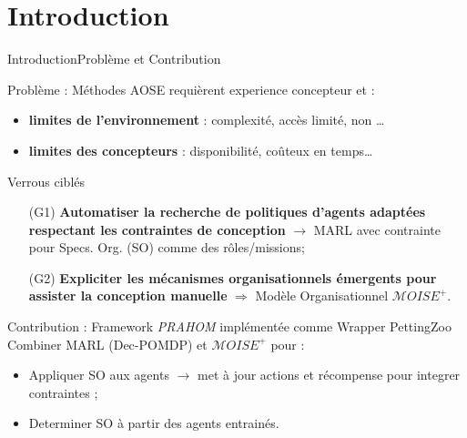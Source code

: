 

\addtocounter{framenumber}{-1}

\section{Introduction}

\begin{frame}{Introduction}{Problème et Contribution}


    \begin{alertblock}{Problème : Méthodes AOSE requièrent experience concepteur et  :}
        \begin{itemize}
            \item \textbf{limites de l'environnement} : complexité, accès limité, non \dots
            \item \textbf{limites des concepteurs} : disponibilité, coûteux en temps\dots
        \end{itemize}
    \end{alertblock}

    \begin{block}{Verrous ciblés}
        \begin{enumerate}
            \item[\phantom{X} (G1)] \textbf{Automatiser la recherche de politiques d'agents adaptées respectant les contraintes de conception} $\rightarrow$ MARL avec contrainte pour Specs. Org. (SO) comme des rôles/missions;
            \item[\phantom{X} (G2)] \textbf{Expliciter les mécanismes organisationnels émergents pour assister la conception manuelle} $\Longrightarrow$ Modèle Organisationnel $\mathcal{M}OISE^+$.
        \end{enumerate}
    \end{block}

    \begin{exampleblock}{Contribution : Framework \textit{PRAHOM} implémentée comme Wrapper PettingZoo~\parencite{soule2024}}
        Combiner MARL (Dec-POMDP) et $\mathcal{M}OISE^+$ pour :
        \begin{itemize}
            \item Appliquer SO aux agents $\rightarrow$ met à jour actions et récompense pour integrer contraintes ;
            \item Determiner SO  à partir des agents entrainés.
        \end{itemize}
    \end{exampleblock}

\end{frame}
